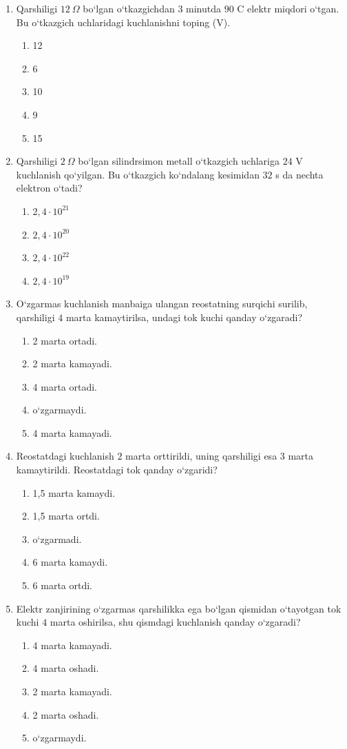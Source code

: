 \begin{enumerate}
\item Qarshiligi $12~\Omega$ bo‘lgan o‘tkazgichdan $3$ minutda $90$ C elektr miqdori o‘tgan. Bu o‘tkazgich uchlaridagi kuchlanishni toping (V).
\begin{enumerate}[label=\Alph*)]
\item 12
\item 6
\item 10
\item 9
\item 15
\end{enumerate}

\item Qarshiligi $2~\Omega$ bo‘lgan silindrsimon metall o‘tkazgich uchlariga $24$ V kuchlanish qo‘yilgan. Bu o‘tkazgich ko‘ndalang kesimidan $32$ s da nechta elektron o‘tadi?
\begin{enumerate}[label=\Alph*)]
\item $2,4\cdot10^{21}$
\item $2,4\cdot10^{20}$
\item $2,4\cdot10^{22}$
\item $2,4\cdot10^{19}$
\end{enumerate}

\item O‘zgarmas kuchlanish manbaiga ulangan reostatning surqichi surilib, qarshiligi $4$ marta kamaytirilsa, undagi tok kuchi qanday o‘zgaradi?
\begin{enumerate}[label=\Alph*)]
\item 2 marta ortadi.
\item 2 marta kamayadi.
\item 4 marta ortadi.
\item o‘zgarmaydi.
\item 4 marta kamayadi.
\end{enumerate}

\item Reostatdagi kuchlanish $2$ marta orttirildi, uning qarshiligi esa $3$ marta kamaytirildi. Reostatdagi tok qanday o‘zgaridi?
\begin{enumerate}[label=\Alph*)]
\item 1,5 marta kamaydi.
\item 1,5 marta ortdi.
\item o‘zgarmadi.
\item 6 marta kamaydi.
\item 6 marta ortdi.
\end{enumerate}

\item Elektr zanjirining o‘zgarmas qarshilikka ega bo‘lgan qismidan o‘tayotgan tok kuchi $4$ marta oshirilsa, shu qismdagi kuchlanish qanday o‘zgaradi?
\begin{enumerate}[label=\Alph*)]
\item 4 marta kamayadi.
\item 4 marta oshadi.
\item 2 marta kamayadi.
\item 2 marta oshadi.
\item o‘zgarmaydi.
\end{enumerate}


\end{enumerate}
